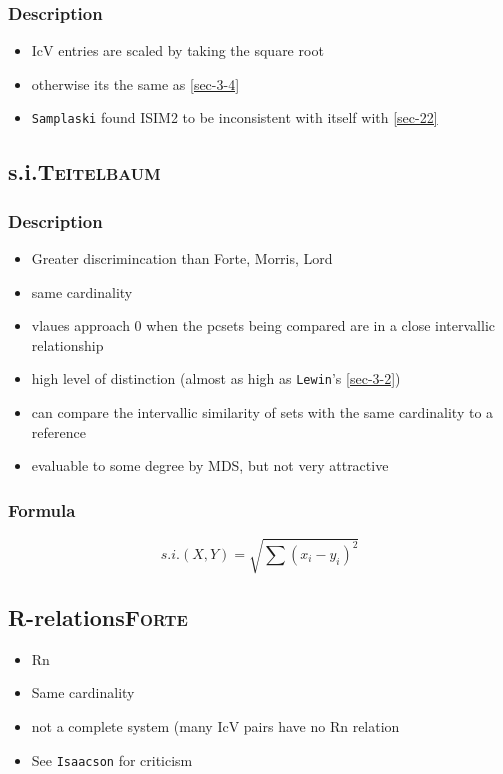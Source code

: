 \documentclass[11pt]{article}
\begin{document}
\subsubsection{Description}
\label{sec-3-5-1}
\begin{itemize}
\item IcV entries are scaled by taking the square root
\item otherwise its the same as \ref{sec-3-4}
\item \texttt{Samplaski} found ISIM2 to be inconsistent with itself with \ref{sec-22}
\end{itemize}

\subsection{s.i.\hfill{}\textsc{Teitelbaum}}
\label{sec-3-6}
\subsubsection{Description}
\label{sec-3-6-1}
\begin{itemize}
\item Greater discrimincation than Forte, Morris, Lord
\item same cardinality
\item vlaues approach 0 when the pcsets being compared are in a close
intervallic relationship
\item high level of distinction (almost as high as \texttt{Lewin}'s \ref{sec-3-2})
\item can compare the intervallic similarity of sets with the same
cardinality to a reference
\item evaluable to some degree by MDS, but not very attractive
\end{itemize}

\subsubsection{Formula}
\label{sec-3-6-2}
$$  s.i.(X,Y) = \sqrt{\sum (x_{i}-y_{i})^{2}} $$

\subsection{R-relations\hfill{}\textsc{Forte}}
\label{sec-3-7}
\begin{itemize}
\item Rn
\item Same cardinality
\item not a complete system (many IcV pairs have no Rn relation
\item See \texttt{Isaacson} for criticism
\end{itemize}
\end{document}
